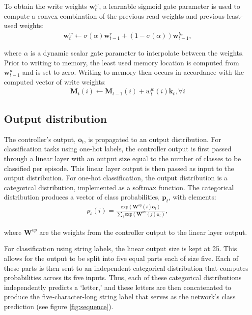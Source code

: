 \documentclass{article}
\begin{document}
To obtain the write weights $\mathbf{w}_t^w$, a learnable sigmoid gate parameter is used to compute a convex combination of the previous read weights and previous least-used weights:
\begin{align}
    \mathbf{w}_t^w \leftarrow \sigma(\alpha) \mathbf{w}_{t-1}^r + (1-\sigma(\alpha))\mathbf{w}_{t-1}^{lu},
\end{align}

where $\alpha$ is a dynamic scalar gate parameter to interpolate between the weights. Prior to writing to memory, the least used memory location is computed from $\mathbf{w}_{t-1}^u$ and is set to zero. Writing to memory then occurs in accordance with the computed vector of write weights:
\begin{align}
    \mathbf{M}_t(i) \leftarrow \mathbf{M}_{t-1}(i) + w_t^{w}(i) \mathbf{k}_{t}, \forall i
\end{align}

\subsection{Output distribution}
The controller's output, $\mathbf{o}_t$, is propagated to an output distribution. For classification tasks using one-hot labels, the controller output is first passed through a linear layer with an output size equal to the number of classes to be classified per episode. This linear layer output is then passed as input to the output distribution. For one-hot classification, the output distribution is a categorical distribution, implemented as a softmax function. The categorical distribution produces a vector of class probabilities, $\mathbf{p}_t$, with elements:
\begin{align}
    p_t(i) = \frac{\text{exp}(\mathbf{W}^{op}(i)\mathbf{o}_t)}{\sum_{j}\text{exp}(\mathbf{W}^{on}(j)\mathbf{o}_t)},
\end{align}

where $\mathbf{W}^{op}$ are the weights from the controller output to the linear layer output.

For classification using string labels, the linear output size is kept at 25. This allows for the output to be split into five equal parts each of size five. Each of these parts is then sent to an independent categorical distribution that computes probabilities across its five inputs. Thus, each of these categorical distributions independently predicts a `letter,' and these letters are then concatenated to produce the five-character-long string label that serves as the network's class prediction (see figure \ref{fig:sequence}). 
\end{document}
